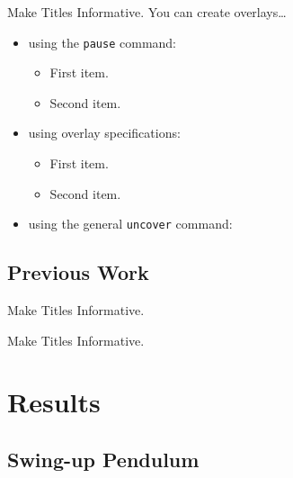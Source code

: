 \documentclass{beamer}
\begin{document}
\begin{frame}{Make Titles Informative.}
  You can create overlays\dots
  \begin{itemize}
  \item using the \texttt{pause} command:
    \begin{itemize}
    \item
      First item.
      \pause
    \item
      Second item.
    \end{itemize}
  \item
    using overlay specifications:
    \begin{itemize}
    \item<3->
      First item.
    \item<4->
      Second item.
    \end{itemize}
  \item
    using the general \texttt{uncover} command:
    \begin{itemize}
    \end{itemize}
  \end{itemize}
\end{frame}

\subsection{Previous Work}

\begin{frame}{Make Titles Informative.}
\end{frame}

\begin{frame}{Make Titles Informative.}
\end{frame}

\section{Results}

\subsection{Swing-up Pendulum}
\end{document}
